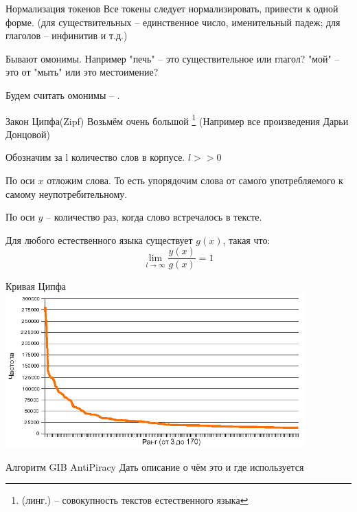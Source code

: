 \begin{frame}{Нормализация токенов}
	Все токены следует нормализировать, привести к одной форме. 
	(для существительных -- единственное число, именительный падеж;
	для глаголов -- инфинитив и т.д.)
	
 	Бывают омонимы. Например "печь" -- это существительное или глагол?
	"мой" -- это от "мыть" или это местоимение?
	
	Будем считать омонимы -- .
\end{frame}

\begin{frame}{Закон Ципфа(Zipf)} 
	\small
	Возьмём очень большой \footnote{(линг.) -- совокупность текстов естественного языка}
	(Например все произведения Дарьи Донцовой)
		
	Обозначим за l количество слов в корпусе. $l >> 0$

	По оси $x$ отложим  слова.
	То есть упорядочим слова от самого употребляемого к самому неупотребительному.
	
	По оси $y$ -- количество раз, когда слово встречалось в тексте.
	
	Для любого естественного языка существует  $g(x)$, такая что:
	\begin{equation}
	\lim_{l \longrightarrow \infty} \frac{y(x)}{g(x)} = 1
	\end{equation}
\end{frame}

\begin{frame}{Кривая Ципфа}
	\includegraphics[width=11.5cm]{../pic/zipf_curve.png}
\end{frame}

\begin{frame}{Алгоритм GIB AntiPiracy}
	Дать описание о чём это и где используется 
\end{frame}


